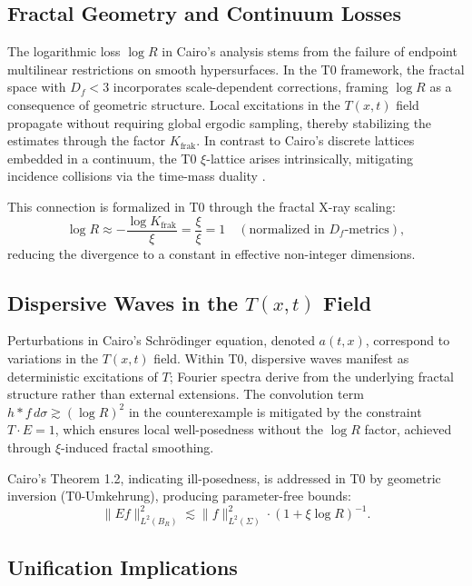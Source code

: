 	\subsection{Fractal Geometry and Continuum Losses}
	
	The logarithmic loss $\log R$ in Cairo's analysis stems from the failure of endpoint multilinear restrictions on smooth hypersurfaces. In the T0 framework, the fractal space with $D_f < 3$ incorporates scale-dependent corrections, framing $\log R$ as a consequence of geometric structure. Local excitations in the $T(x,t)$ field propagate without requiring global ergodic sampling, thereby stabilizing the estimates through the factor $K_\text{frak}$. In contrast to Cairo's discrete lattices embedded in a continuum, the T0 $\xi$-lattice arises intrinsically, mitigating incidence collisions via the time-mass duality \cite{T0_netze_en}.
	
	This connection is formalized in T0 through the fractal X-ray scaling:
	\begin{equation}
		\log R \approx -\frac{\log K_\text{frak}}{\xi} = \frac{\xi}{\xi} = 1 \quad (\text{normalized in } D_f\text{-metrics}),
	\end{equation}
	reducing the divergence to a constant in effective non-integer dimensions.
	
	\subsection{Dispersive Waves in the $T(x,t)$ Field}
	
	Perturbations in Cairo's Schrödinger equation, denoted $a(t,x)$, correspond to variations in the $T(x,t)$ field. Within T0, dispersive waves manifest as deterministic excitations of $T$; Fourier spectra derive from the underlying fractal structure rather than external extensions. The convolution term $h \ast f \, d\sigma \gtrsim (\log R)^2$ in the counterexample is mitigated by the constraint $T \cdot E = 1$, which ensures local well-posedness without the $\log R$ factor, achieved through $\xi$-induced fractal smoothing.
	
	Cairo's Theorem 1.2, indicating ill-posedness, is addressed in T0 by geometric inversion (T0-Umkehrung), producing parameter-free bounds:
	\begin{equation}
		\|Ef\|_{L^2(B_R)}^2 \lesssim \|f\|_{L^2(\Sigma)}^2 \cdot (1 + \xi \log R)^{-1}.
	\end{equation}
	
	\subsection{Unification Implications}
	
